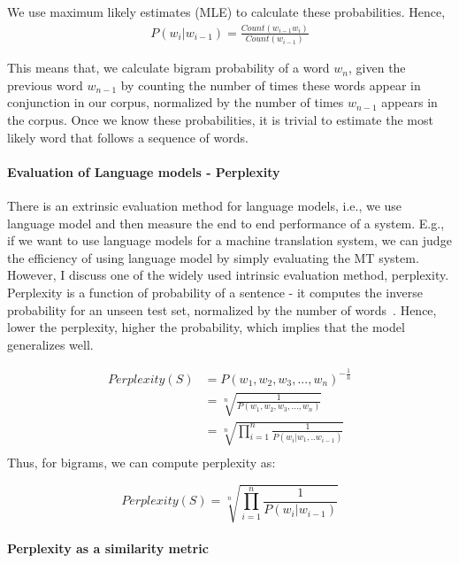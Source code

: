 We use maximum likely estimates (MLE) to calculate these probabilities. Hence,
\begin{align}
    P(w_i|w_{i-1}) = \frac{Count(w_{i-1}w_i)}{Count(w_{i-1})}
\end{align}

This means that, we calculate bigram probability of a word $w_n$, given the previous word $w_{n-1}$ by counting the number of times these words appear in conjunction in our corpus, normalized by the number of times $w_{n-1}$ appears in the corpus. 
Once we know these probabilities, it is trivial to estimate the most likely word that follows a sequence of words.  

\paragraph*{Evaluation of Language models - Perplexity}

There is an extrinsic evaluation method for language models, i.e., we use language model and then measure the end to end performance of a system. E.g., if we want to use language models for a machine translation system, we can judge the efficiency of using language model by simply evaluating the MT system. However, I discuss one of the widely used intrinsic evaluation method, perplexity. Perplexity is a function of probability of a sentence - it computes the inverse probability for an unseen test set, normalized by the number of words~\citep{jurafsky2014speech}. Hence, lower the perplexity, higher the probability, which implies that the model generalizes well.


\begin{equation}
    \begin{aligned}
    Perplexity(S) & = P(w_1,w_2,w_3, ... , w_n)^{-\frac{1}{n}} \\
    & = \sqrt[n]{\frac{1}{P(w_1,w_2,w_3, ... , w_n)}} \\
    & = \sqrt[n]{\prod_{i=1}^{n}\frac{1}{P(w_i|w_1, .. w_{i-1})}} \\
    \end{aligned}
\end{equation}
Thus, for bigrams, we can compute perplexity as:

\begin{equation}
    Perplexity(S) = \sqrt[n]{\prod_{i=1}^{n}\frac{1}{P(w_i|w_{i-1})}}
\end{equation}
    
\paragraph*{Perplexity as a similarity metric}

